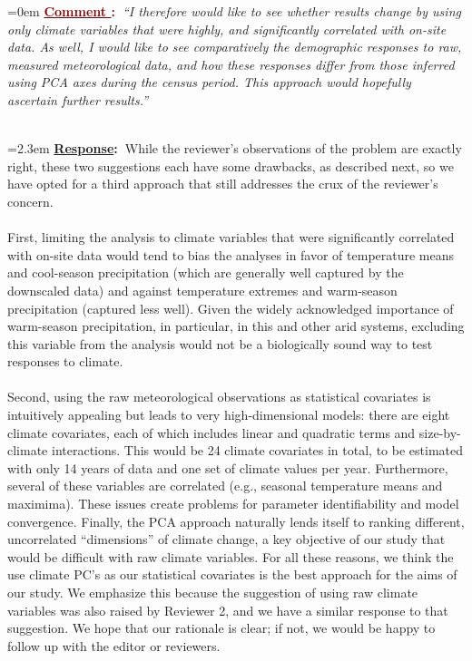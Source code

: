 \documentclass[12pt]{article}
\newcounter{cN}
\newcommand{\comment}[1]{
	\vspace{2em}
	\refstepcounter{cN} %
	\noindent \hangindent=0em \textbf{\textcolor{Maroon}{\uline{Comment \thecN}:~}}\emph{``#1''}
	}
\newcommand{\response}[1]{
	\\[0.25em]
	\hangindent=2.3em \textbf{\textcolor{NavyBlue}{\uline{Response}:~}}#1
	}
\begin{document}
\comment{I therefore would like to see whether results change by using only climate variables that were highly, and significantly correlated with on-site data. As well, I would like to see comparatively the demographic responses to raw, measured meteorological data, and how these responses differ from those inferred using PCA axes during the census period. 
This approach would hopefully ascertain further results.}
\response{While the reviewer's observations of the problem are exactly right, these two suggestions each have some drawbacks, as described next, so we have opted for a third approach that still addresses the crux of the reviewer's concern. 
\\
\\
First, limiting the analysis to climate variables that were significantly correlated with on-site data would tend to bias the analyses in favor of temperature means and cool-season precipitation (which are generally well captured by the downscaled data) and against temperature extremes and warm-season precipitation (captured less well). 
Given the widely acknowledged importance of warm-season precipitation, in particular, in this and other arid systems, excluding this variable from the analysis would not be a biologically sound way to test responses to climate. 
\\
\\
Second, using the raw meteorological observations as statistical covariates is intuitively appealing but leads to very high-dimensional models: there are eight climate covariates, each of which includes linear and quadratic terms and size-by-climate interactions. This would be 24 climate covariates in total, to be estimated with only 14 years of data and one set of climate values per year.
Furthermore, several of these variables are correlated (e.g., seasonal temperature means and maximima). 
These issues create problems for parameter identifiability and model convergence.
Finally, the PCA approach naturally lends itself to ranking different, uncorrelated ``dimensions'' of climate change, a key objective of our study that would be difficult with raw climate variables. 
For all these reasons, we think the use climate PC's as our statistical covariates is the best approach for the aims of our study. 
We emphasize this because the suggestion of using raw climate variables was also raised by Reviewer 2, and we have a similar response to that suggestion. 
We hope that our rationale is clear; if not, we would be happy to follow up with the editor or reviewers. 
\\
}
\end{document}
